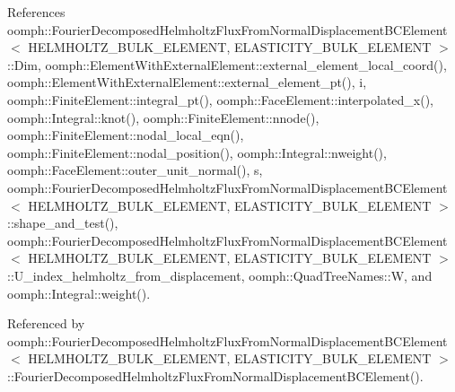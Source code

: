 References oomph\+::\+Fourier\+Decomposed\+Helmholtz\+Flux\+From\+Normal\+Displacement\+B\+C\+Element$<$ H\+E\+L\+M\+H\+O\+L\+T\+Z\+\_\+\+B\+U\+L\+K\+\_\+\+E\+L\+E\+M\+E\+N\+T, E\+L\+A\+S\+T\+I\+C\+I\+T\+Y\+\_\+\+B\+U\+L\+K\+\_\+\+E\+L\+E\+M\+E\+N\+T $>$\+::\+Dim, oomph\+::\+Element\+With\+External\+Element\+::external\+\_\+element\+\_\+local\+\_\+coord(), oomph\+::\+Element\+With\+External\+Element\+::external\+\_\+element\+\_\+pt(), i, oomph\+::\+Finite\+Element\+::integral\+\_\+pt(), oomph\+::\+Face\+Element\+::interpolated\+\_\+x(), oomph\+::\+Integral\+::knot(), oomph\+::\+Finite\+Element\+::nnode(), oomph\+::\+Finite\+Element\+::nodal\+\_\+local\+\_\+eqn(), oomph\+::\+Finite\+Element\+::nodal\+\_\+position(), oomph\+::\+Integral\+::nweight(), oomph\+::\+Face\+Element\+::outer\+\_\+unit\+\_\+normal(), s, oomph\+::\+Fourier\+Decomposed\+Helmholtz\+Flux\+From\+Normal\+Displacement\+B\+C\+Element$<$ H\+E\+L\+M\+H\+O\+L\+T\+Z\+\_\+\+B\+U\+L\+K\+\_\+\+E\+L\+E\+M\+E\+N\+T, E\+L\+A\+S\+T\+I\+C\+I\+T\+Y\+\_\+\+B\+U\+L\+K\+\_\+\+E\+L\+E\+M\+E\+N\+T $>$\+::shape\+\_\+and\+\_\+test(), oomph\+::\+Fourier\+Decomposed\+Helmholtz\+Flux\+From\+Normal\+Displacement\+B\+C\+Element$<$ H\+E\+L\+M\+H\+O\+L\+T\+Z\+\_\+\+B\+U\+L\+K\+\_\+\+E\+L\+E\+M\+E\+N\+T, E\+L\+A\+S\+T\+I\+C\+I\+T\+Y\+\_\+\+B\+U\+L\+K\+\_\+\+E\+L\+E\+M\+E\+N\+T $>$\+::\+U\+\_\+index\+\_\+helmholtz\+\_\+from\+\_\+displacement, oomph\+::\+Quad\+Tree\+Names\+::W, and oomph\+::\+Integral\+::weight().



Referenced by oomph\+::\+Fourier\+Decomposed\+Helmholtz\+Flux\+From\+Normal\+Displacement\+B\+C\+Element$<$ H\+E\+L\+M\+H\+O\+L\+T\+Z\+\_\+\+B\+U\+L\+K\+\_\+\+E\+L\+E\+M\+E\+N\+T, E\+L\+A\+S\+T\+I\+C\+I\+T\+Y\+\_\+\+B\+U\+L\+K\+\_\+\+E\+L\+E\+M\+E\+N\+T $>$\+::\+Fourier\+Decomposed\+Helmholtz\+Flux\+From\+Normal\+Displacement\+B\+C\+Element().

\mbox{\label{classoomph_1_1FourierDecomposedHelmholtzFluxFromNormalDisplacementBCElement_a3846857ca5fe15cc5c8020d8f0117b67}} 
